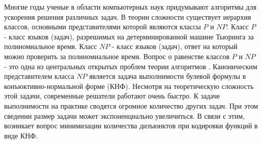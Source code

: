 
Многие годы ученые в области компьютерных наук придумывают алгоритмы для ускорения решения различных задач. В теории сложности существует иерархия классов, основными представителями которой являются классы $P$ и $NP$. Класс $P$ - класс языков (задач), разрешимых на детерминированной машине Тьюринга за полиномиальное время. Класс $NP$ - класс языков (задач), ответ на который можно проверить за полиномиальное время. Вопрос о равенстве классов $P$ и $NP$ - это одна из центральных открытых проблем теории алгоритмов \cite{?} . Каноническим представителем класса $NP$ является задача выполнимости булевой формулы в конъюктивно-нормальной форме (КНФ). Несмотря на теоретическую сложность этой задачи, современные решатели работают очень быстро. К задаче выполнимости на практике сводятся огромное количество других задач. При этом сведении размер задачи может экспоненциально увеличиться. В связи с этим, возникает вопрос минимизации количества дизъюнктов при кодировки функций в виде КНФ.